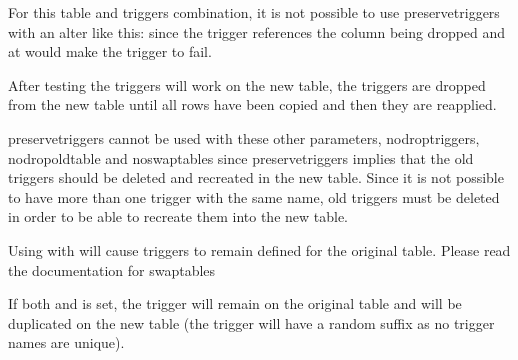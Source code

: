 \documentclass[letterpaper,10pt,english]{sphinxmanual}
\begin{document}
\begin{fulllineitems}
For this table and triggers combination, it is not possible to use \textendash{}preserve\sphinxhyphen{}triggers
with an \textendash{}alter like this:  since the trigger references the column
being dropped and at would make the trigger to fail.

After testing the triggers will work on the new table, the triggers are
dropped from the new table until all rows have been copied and then they are
re\sphinxhyphen{}applied.

\textendash{}preserve\sphinxhyphen{}triggers cannot be used with these other parameters, \textendash{}no\sphinxhyphen{}drop\sphinxhyphen{}triggers,
\textendash{}no\sphinxhyphen{}drop\sphinxhyphen{}old\sphinxhyphen{}table and \textendash{}no\sphinxhyphen{}swap\sphinxhyphen{}tables since \textendash{}preserve\sphinxhyphen{}triggers implies that
the old triggers should be deleted and recreated in the new table.
Since it is not possible to have more than one trigger with the same name, old triggers
must be deleted in order to be able to recreate them into the new table.

Using  with  will cause triggers to remain
defined for the original table.
Please read the documentation for \textendash{}swap\sphinxhyphen{}tables

If both  and  is set, the trigger will remain
on the original table and will be duplicated on the new table
(the trigger will have a random suffix as no trigger names are unique).

\end{fulllineitems}

\end{document}

